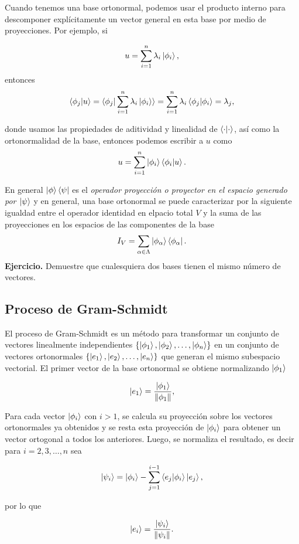 \documentclass[letterpaper]{book}
\newcommand{\exe}{{\noindent \sc \textbf{Ejercicio. }}}
\begin{document}
Cuando tenemos una base ortonormal, podemos usar el producto interno para descomponer explícitamente un vector general en esta base por medio de proyecciones. Por ejemplo, si

\[
u = \sum_{i=1}^n \lambda_i \ket{\phi_i},
\]
entonces
\[
\braket{\phi_j| u} = \braket{\phi_j| \sum_{i=1}^n \lambda_i \ket{\phi_i}} = \sum_{i=1}^n \lambda_i\braket{\phi_j |\phi_i} = \lambda_j,
\]

donde usamos las propiedades de aditividad y linealidad de \(\braket{\cdot|\cdot}\), así como la ortonormalidad de la base, entonces podemos escribir a \(u\) como
\[
u = \sum_{i=1}^n \ket{\phi_i}\braket{\phi_i|u}.
\]

En general \(\ket{\phi}\bra{\psi}\) es el \emph{operador proyección o proyector en el espacio generado por \(\ket{\psi}\)} y en general, una base ortonormal se puede caracterizar por la siguiente igualdad entre el operador identidad en elpacio total \(V\) y la suma de las proyecciones en los espacios de las componentes de la base
\[
I_{V}=\sum_{\alpha\in\Lambda}\ket{\phi_{\alpha}}\bra{\phi_{\alpha}}.
\]
\exe Demuestre que cualesquiera dos bases tienen el mismo número de vectores.

\subsection{Proceso de Gram-Schmidt}

\noindent El proceso de Gram-Schmidt es un método para transformar un conjunto de vectores linealmente independientes \(\{\ket{\phi_1}, \ket{\phi_2}, \dots, \ket{\phi_n}\}\) en un conjunto de vectores ortonormales \(\{\ket{e_1}, \ket{e_2}, \dots, \ket{e_n}\}\) que generan el mismo subespacio vectorial. El primer vector de la base ortonormal se obtiene normalizando \(\ket{\phi_1}\)

\[
\ket{e_1} = \frac{\ket{\phi_1}}{\Vert\phi_1\Vert},
\]

Para cada vector \(\ket{\phi_i}\) con \(i > 1\), se calcula su proyección sobre los vectores ortonormales ya obtenidos y se resta esta proyección de \(\ket{\phi_i}\) para obtener un vector ortogonal a todos los anteriores. Luego, se normaliza el resultado, es decir para \(i = 2, 3, \dots, n\) sea

\[
\ket{\psi_i} = \ket{\phi_i} - \sum_{j=1}^{i-1} \braket{e_j | \phi_i} \ket{e_j},
\]

\noindent por lo que

\[
\ket{e_i} = \frac{\ket{\psi_i}}{\Vert\psi_i\Vert}.
\]
\end{document}
